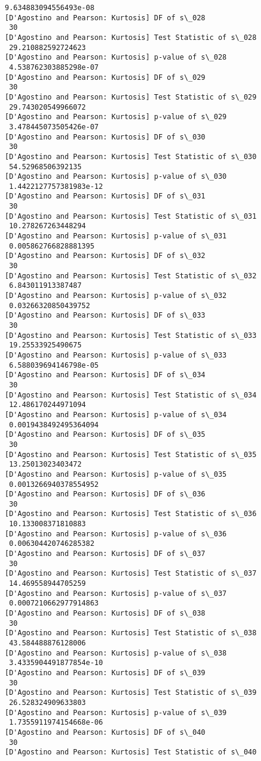 \documentclass[11pt]{article}
\begin{document}
\begin{Verbatim}[commandchars=\\\{\}]
 9.634883094556493e-08
[D'Agostino and Pearson: Kurtosis] DF of s\_028
 30
[D'Agostino and Pearson: Kurtosis] Test Statistic of s\_028
 29.210882592724623
[D'Agostino and Pearson: Kurtosis] p-value of s\_028
 4.538762303885298e-07
[D'Agostino and Pearson: Kurtosis] DF of s\_029
 30
[D'Agostino and Pearson: Kurtosis] Test Statistic of s\_029
 29.743020549966072
[D'Agostino and Pearson: Kurtosis] p-value of s\_029
 3.478445073505426e-07
[D'Agostino and Pearson: Kurtosis] DF of s\_030
 30
[D'Agostino and Pearson: Kurtosis] Test Statistic of s\_030
 54.52968506392135
[D'Agostino and Pearson: Kurtosis] p-value of s\_030
 1.4422127757381983e-12
[D'Agostino and Pearson: Kurtosis] DF of s\_031
 30
[D'Agostino and Pearson: Kurtosis] Test Statistic of s\_031
 10.278267263448294
[D'Agostino and Pearson: Kurtosis] p-value of s\_031
 0.005862766828881395
[D'Agostino and Pearson: Kurtosis] DF of s\_032
 30
[D'Agostino and Pearson: Kurtosis] Test Statistic of s\_032
 6.843011913387487
[D'Agostino and Pearson: Kurtosis] p-value of s\_032
 0.03266320850439752
[D'Agostino and Pearson: Kurtosis] DF of s\_033
 30
[D'Agostino and Pearson: Kurtosis] Test Statistic of s\_033
 19.25533925490675
[D'Agostino and Pearson: Kurtosis] p-value of s\_033
 6.588039694146798e-05
[D'Agostino and Pearson: Kurtosis] DF of s\_034
 30
[D'Agostino and Pearson: Kurtosis] Test Statistic of s\_034
 12.486170244971094
[D'Agostino and Pearson: Kurtosis] p-value of s\_034
 0.0019438492495364094
[D'Agostino and Pearson: Kurtosis] DF of s\_035
 30
[D'Agostino and Pearson: Kurtosis] Test Statistic of s\_035
 13.25013023403472
[D'Agostino and Pearson: Kurtosis] p-value of s\_035
 0.0013266940378554952
[D'Agostino and Pearson: Kurtosis] DF of s\_036
 30
[D'Agostino and Pearson: Kurtosis] Test Statistic of s\_036
 10.133008371810883
[D'Agostino and Pearson: Kurtosis] p-value of s\_036
 0.006304420746285382
[D'Agostino and Pearson: Kurtosis] DF of s\_037
 30
[D'Agostino and Pearson: Kurtosis] Test Statistic of s\_037
 14.469558944705259
[D'Agostino and Pearson: Kurtosis] p-value of s\_037
 0.0007210662977914863
[D'Agostino and Pearson: Kurtosis] DF of s\_038
 30
[D'Agostino and Pearson: Kurtosis] Test Statistic of s\_038
 43.584488876128006
[D'Agostino and Pearson: Kurtosis] p-value of s\_038
 3.4335904491877854e-10
[D'Agostino and Pearson: Kurtosis] DF of s\_039
 30
[D'Agostino and Pearson: Kurtosis] Test Statistic of s\_039
 26.528324909633803
[D'Agostino and Pearson: Kurtosis] p-value of s\_039
 1.7355911974154668e-06
[D'Agostino and Pearson: Kurtosis] DF of s\_040
 30
[D'Agostino and Pearson: Kurtosis] Test Statistic of s\_040

\end{Verbatim}
\end{document}
